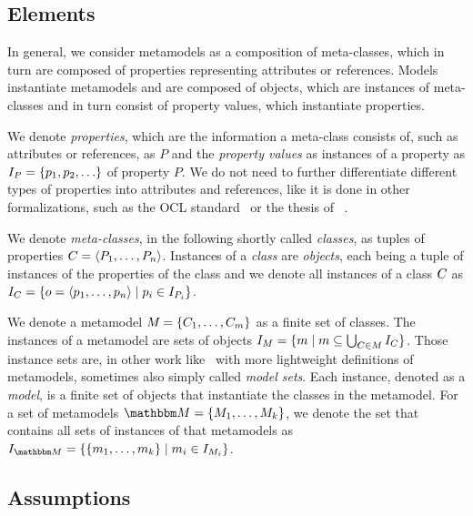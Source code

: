 \subsection{Elements}

In general, we consider metamodels as a composition of meta-classes, which in turn are composed of properties representing attributes or references.
Models instantiate metamodels and are composed of objects, which are instances of meta-classes and in turn consist of property values, which instantiate properties.

We denote \emph{properties}, which are the information a meta-class consists of, such as attributes or references, as $P$ and the \emph{property values} as instances of a property as $\metamodelinstances{P} = \setted{p_1, p_2, \dots}$ of property $P$. 
We do not need to further differentiate different types of properties into attributes and references, like it is done in other formalizations, such as the OCL standard~\cite[A.1]{ocl} or the thesis of \citeauthor{kramer2017a}~\cite[2.3.2]{kramer2017a}.

We denote \emph{meta-classes}, in the following shortly called \emph{classes}, as tuples of properties $C_{} = \langle P_1, \dots, P_n \rangle$. 
Instances of a \emph{class} are \emph{objects}, each being a tuple of instances of the properties of the class and we denote all instances of a class $C_{}$ as $I_{C} = \{ o = \langle p_1, \dots, p_n \rangle \mid p_i \in I_{P_i} \}$.

We denote a metamodel $M_{} = \{ C_{1}, \dots, C_{m} \}$ as a finite set of classes.
The instances of a metamodel are sets of objects $I_{M} = \{ m \mid m \subseteq \bigcup_{C_{} \in M_{}} I_{C} \}$.
Those instance sets are, in other work like~\cite{stevens2020BidirectionalTransformationLarge-SoSym} with more lightweight definitions of metamodels, sometimes also simply called \emph{model sets}.
Each instance, denoted as a \emph{model}, is a finite set of objects that instantiate the classes in the metamodel.
For a set of metamodels $\metamodelset{M} = \setted{\metamodel{M}{1}, \dots, \metamodel{M}{k}}$, we denote the set that contains all sets of instances of that metamodels as $\metamodelinstances{\metamodelset{M}} = \setted{ \setted{\model{m}{1}, \dots, \model{m}{k}} \mid \model{m}{i} \in \metamodelinstances{\metamodel{M}{i}}}$.



\subsection{Assumptions}
\label{chap:networks:assumption}


